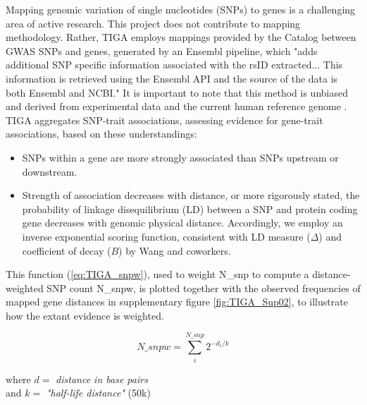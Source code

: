 Mapping  genomic  variation  of  single  nucleotides  (SNPs)  to  genes  is  a  challenging  area  of active  research\cite{Liu2010-fe,Mishra2015-rm,Lamparter2016-zb}.  This project  does not contribute to mapping methodology.  Rather, TIGA employs mappings provided by the Catalog between GWAS SNPs and genes,  generated by an Ensembl pipeline, which "adds additional SNP specific information associated with the rsID extracted... This information is retrieved using the Ensembl API and the source of the data is both Ensembl and NCBI."\cite{The_NHGRI-EBI_GWAS_Catalog_undated-kl} It is important to note that this method is unbiased and derived from experimental data and the current human reference genome . TIGA aggregates SNP-trait associations, assessing evidence for gene-trait associations, based on these understandings:

\begin{itemize}
\item SNPs within a gene are more strongly associated than SNPs upstream or downstream.
\item Strength of association decreases with distance, or more rigorously stated, the probability of linkage disequilibrium (LD) between a SNP and protein coding gene decreases with genomic physical distance. Accordingly, we employ an inverse exponential scoring function, consistent with LD measure ($\Delta$) and coefficient of decay ($B$) by Wang and coworkers\cite{Wang2006-ja}. 
\end{itemize}

This function (\ref{eq:TIGA_snpw}), used to weight N\_snp to compute a distance-weighted SNP count N\_snpw, is plotted together with the observed frequencies of mapped gene distances in supplementary figure \ref{fig:TIGA_Sup02}, to illustrate how the extant evidence is weighted. 

\begin{equation}
    N\_snpw = \sum_{i}^{N\_snp}  2^{-d_{i}/k}
    \label{eq:TIGA_snpw}
\end{equation}

\begin{center}
    where $ d = $ \emph{distance in base pairs} \\
    and $ k = $ \emph{"half-life distance"} (50k)
\end{center}

